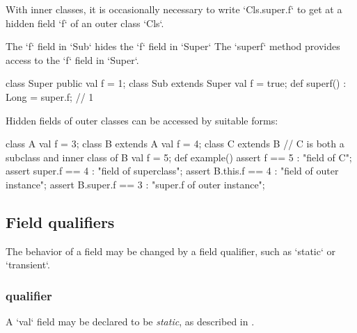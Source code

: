 With inner classes, it is occasionally necessary to 
write \xcd`Cls.super.f` to get at a hidden field \xcd`f` of an outer class
\xcd`Cls`. 

\begin{ex}
The \xcd`f` field in \xcd`Sub` hides the \xcd`f` field in \xcd`Super`
The \xcd`superf` method provides access to the \xcd`f` field in \xcd`Super`.
\begin{xten}
class Super{ 
  public val f = 1; 
}
class Sub extends Super {
  val f = true;
  def superf() : Long = super.f; // 1
}
\end{xten}
\end{ex}

\begin{ex}
Hidden fields of outer classes can be accessed by suitable forms: 
\begin{xten}
class A {
   val f = 3;
}
class B extends A {
   val f = 4;
   class C extends B {
      // C is both a subclass and inner class of B
      val f = 5;
       def example() {
         assert f         == 5 : "field of C";
         assert super.f   == 4 : "field of superclass";
         assert B.this.f  == 4 : "field of outer instance";
         assert B.super.f == 3 : "super.f of outer instance";
       }
    }
}
\end{xten}
\end{ex}

\subsection{Field qualifiers}
\label{FieldQualifier}

The behavior of a field may be changed by a field qualifier, such as
\xcd`static` or \xcd`transient`.  


\subsubsection{ qualifier}

A \xcd`val` field may be declared to be {\em static}, as described in
. 

